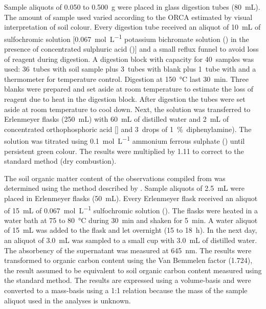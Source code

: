 Sample aliquots of \num{0.050} to \SI{0.500}{\gram} were placed in glass digestion tubes 
(\SI{80}{\milli\liter}). The amount of sample used varied according to the ORCA estimated by visual 
interpretation of soil colour. Every digestion tube received an aliquot of \SI{10}{\milli\liter} of 
sulfochromic solution\footsulfochromic{} [\SI{0.067}{\mole\per\liter} potassium bichromate solution
() in the presence of concentrated sulphuric acid ()] and a small reflux funnel 
to avoid loss of reagent during digestion. A digestion block with capacity for \num{40}~samples was used:
\num{36}~tubes with soil sample plus \num{3}~tubes with blank plus \num{1}~tube with  and a
thermometer for temperature control. Digestion at \SI{150}{\celsius} last \SI{30}{\minute}. Three blanks 
were prepared and set aside at room temperature to estimate the loss of reagent due to heat in the digestion 
block. After digestion the tubes were set aside at room temperature to cool down. Next, the solution was 
transferred to Erlenmeyer flasks (\SI{250}{\milli\liter}) with \SI{60}{\milli\liter} of distilled water and
\SI{2}{\milli\liter} of concentrated orthophosphoric acid [] and \num{3}~drops of 
\SI{1}{\percent}~diphenylamine). The solution was titrated using \SI{0.1}{\mole\per\liter} ammonium ferrous
sulphate () until persistent green colour. The results were multiplied by \num{1.11}
to correct to the standard method (dry combustion).

The soil organic matter content of the observations compiled from  was determined 
using the method described by . Sample aliquots of \SI{2.5}{\milli\liter}
were placed in Erlenmeyer flasks (\SI{50}{\milli\liter}). Every Erlenmeyer flask received an aliquot of 
\SI{15}{\milli\liter} of \SI{0.067}{\mole\per\liter} sulfochromic solution (). The 
flasks were heated in a water bath at \num{75} to \SI{80}{\celsius} during \SI{30}{\minute} and shaken 
for \SI{5}{\minute}. A water aliquot of \SI{15}{\milli\liter} was added to the flask and let overnight 
(\num{15} to \SI{18}{\hour}). In the next day, an aliquot of \SI{3.0}{\milli\liter} was sampled to a 
small cup with \SI{3.0}{\milli\liter} of distilled water. The absorbency of the supernatant was measured 
at \SI{645}{\nano\metre}. The results were transformed to organic carbon content using the Van Bemmelen 
factor (\num{1.724}), the result assumed to be equivalent to soil organic carbon content measured using the 
standard method. The results are expressed using a volume-basis and were converted to a mass-basis using a
1:1 relation because the mass of the sample aliquot used in the analyses is unknown.

